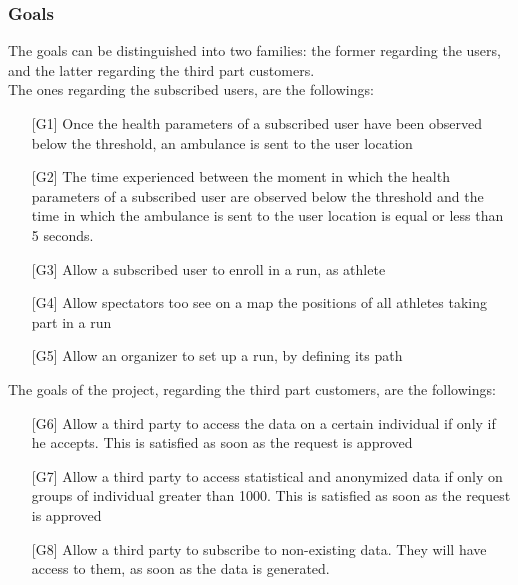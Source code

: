 \subsubsection{Goals}
The goals can be distinguished into two families: the former regarding the users, and the latter regarding the third part customers.\\
The ones regarding the subscribed users, are the followings:
\begin{enumerate}
\item[{[G1]}] Once the health parameters of a subscribed user have been observed 
below the threshold, an ambulance is sent to the user location 
\item[{[G2]}] The time experienced between the moment in which the health parameters of a subscribed user are observed below the threshold and the time in which the ambulance is sent to the user location is equal or less than 5 seconds. 
\item[{[G3]}] Allow a subscribed user to enroll in a run, as athlete
\item[{[G4]}] Allow spectators too see on a map the positions of all athletes taking part in a run
\item[{[G5]}] Allow an organizer to set up a run, by defining its path
\end{enumerate}
The goals of the project, regarding the third part customers, are the followings:
\begin{enumerate}
\item[{[G6]}] Allow a third party to access the data on a certain individual if only if he accepts. This is satisfied as soon as the request is approved
\item[{[G7]}] Allow a third party to access statistical and anonymized data if only on groups of individual greater than 1000. This is satisfied as soon as the request is approved
\item[{[G8]}] Allow a third party to subscribe to non-existing data. They will have access to them, as soon as the data is generated. 
\end{enumerate}